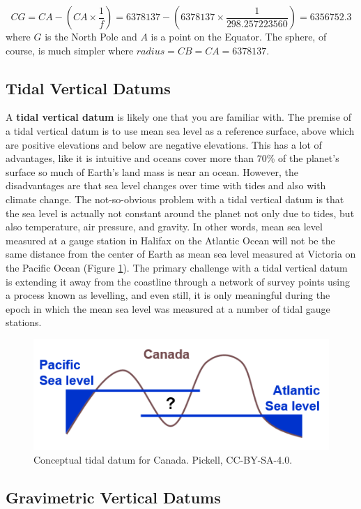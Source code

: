 \documentclass[
]{book}
\begin{document}
\[
CG=CA-(CA×\frac{1}{f})=6378137-(6378137×\frac{1}{298.257223560})=6356752.3
\]
where \(G\) is the North Pole and \(A\) is a point on the Equator. The sphere, of course, is much simpler where \(radius=CB=CA=6378137\).

\subsection{Tidal Vertical Datums}\label{tidal-vertical-datums}

A \textbf{tidal vertical datum} is likely one that you are familiar with. The premise of a tidal vertical datum is to use mean sea level as a reference surface, above which are positive elevations and below are negative elevations. This has a lot of advantages, like it is intuitive and oceans cover more than 70\% of the planet's surface so much of Earth's land mass is near an ocean. However, the disadvantages are that sea level changes over time with tides and also with climate change. The not-so-obvious problem with a tidal vertical datum is that the sea level is actually not constant around the planet not only due to tides, but also temperature, air pressure, and gravity. In other words, mean sea level measured at a gauge station in Halifax on the Atlantic Ocean will not be the same distance from the center of Earth as mean sea level measured at Victoria on the Pacific Ocean (Figure \ref{fig:2-tidal-datum}). The primary challenge with a tidal vertical datum is extending it away from the coastline through a network of survey points using a process known as levelling, and even still, it is only meaningful during the epoch in which the mean sea level was measured at a number of tidal gauge stations.

\begin{figure}
\includegraphics[width=0.75\linewidth]{images/02-tidal-datum} \caption{Conceptual tidal datum for Canada. Pickell, CC-BY-SA-4.0.}\label{fig:2-tidal-datum}
\end{figure}

\subsection{Gravimetric Vertical Datums}\label{gravimetric-vertical-datums}
\end{document}
